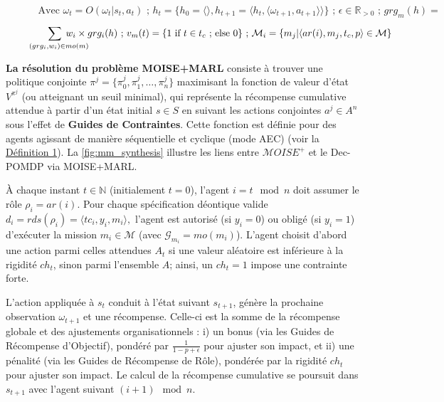 \documentclass[francais,ROIA,Unicode,manuscript]{cedram}
\begin{document}
\begin{figure*}[h!]
\begin{scriptsize}
{\begin{gather*}
                \text{Avec } \omega_t = O(\omega_t | s_t, a_t) \text{ ; } h_t = \{h_0 = \langle \rangle, h_{t+1} = \langle h_t, \langle \omega_{t+1}, a_{t+1} \rangle \rangle \} \text{ ; } \epsilon \in \mathbb{R}_{>0} \text{ ; } grg_m(h) =
            \end{gather*}
        }
        \vspace{-0.2cm}
        \textcolor{blue}{
            \begin{gather*}
                \hspace{-0.5cm} \sum_{\hspace{0.3cm}(grg_i,w_i) \in mo(m)}{\hspace{-0.9cm} w_i \times grg_i(h)}
                \text{ ; } v_m(t) = \{ 1 \text{ if } t \in t_c \text{ ; else } 0 \} \text{ ; } \mathcal{M}_i = \{m_j | \langle ar(i),m_j,t_c,p \rangle \in \mathcal{M}\}
            \end{gather*}
        }
        \vspace{0.cm}
    \end{scriptsize}

\end{figure*}


\textbf{La résolution du problème MOISE+MARL} consiste à trouver une politique conjointe
$
    \pi^j = \{\pi^j_0, \pi^j_1, \dots, \pi^j_n\}
$
maximisant la fonction de valeur d'état \(V^{\pi^j}\) (ou atteignant un seuil minimal), qui représente la récompense cumulative attendue à partir d'un état initial \(s \in S\) en suivant les actions conjointes \(a^j \in A^n\) sous l'effet de \textbf{Guides de Contraintes}. Cette fonction est définie pour des agents agissant de manière séquentielle et cyclique (mode AEC) (voir la \hyperref[eq:single_value_function]{Définition 1}). La \autoref{fig:mm_synthesis} illustre les liens entre \(\mathcal{M}OISE^+\) et le Dec-POMDP via MOISE+MARL.

À chaque instant \(t \in \mathbb{N}\) (initialement \(t=0\)), l'agent \(i = t \mod n\) doit assumer le rôle \(\rho_i = ar(i)\). Pour chaque spécification déontique valide
$
    d_i = rds(\rho_i) = \langle tc_i, y_i, m_i \rangle,
$
l'agent est autorisé (si \(y_i=0\)) ou obligé (si \(y_i=1\)) d'exécuter la mission \(m_i \in \mathcal{M}\) (avec \(\mathcal{G}_{m_i} = mo(m_i)\)). L'agent choisit d'abord une action parmi celles attendues \(A_t\) si une valeur aléatoire est inférieure à la rigidité \(ch_t\), sinon parmi l'ensemble \(A\); ainsi, un \(ch_t = 1\) impose une contrainte forte.

L'action appliquée à \(s_t\) conduit à l'état suivant \(s_{t+1}\), génère la prochaine observation \(\omega_{t+1}\) et une récompense. Celle-ci est la somme de la récompense globale et des ajustements organisationnels :
i) un bonus (via les Guides de Récompense d'Objectif), pondéré par \(\frac{1}{1-p+\epsilon}\) pour ajuster son impact, et
ii) une pénalité (via les Guides de Récompense de Rôle), pondérée par la rigidité \(ch_t\) pour ajuster son impact.
Le calcul de la récompense cumulative se poursuit dans \(s_{t+1}\) avec l'agent suivant \((i+1) \mod n\).
\end{document}
